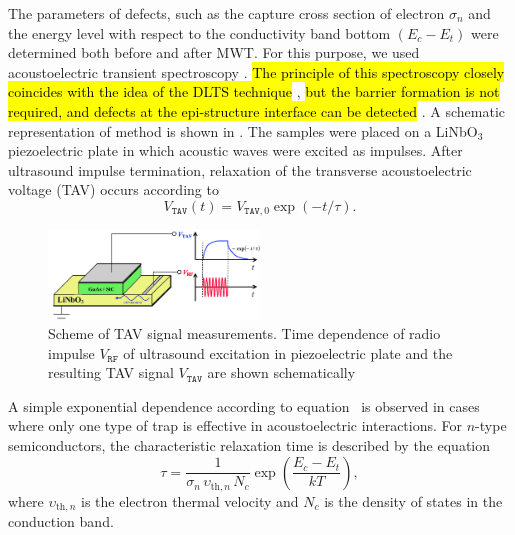 \documentclass[10pt]{iopart}
\begin{document}
The parameters of defects, such as the capture cross section of electron $\sigma_n$
and the energy level with respect to the conductivity band bottom $(E_c-E_t)$ were determined both before and after MWT.
For this purpose, we used acoustoelectric transient spectroscopy \cite{OstrovPAN,OlikhSSC,OstrovskiiSST,PANnewEn}.
\hl{The  principle of this spectroscopy closely coincides with the idea  of  the DLTS
technique} \cite{TAV:1993MIS},
\hl{but the  barrier formation is not required,
and defects at the epi-structure interface can be detected} \cite{OstrovPAN,OlikhSSC,OstrovskiiSST}.
A schematic representation of method is shown in .
The samples were placed on a LiNbO$_3$ piezoelectric plate in which acoustic waves were excited as impulses.
After ultrasound impulse termination, relaxation of the transverse  acoustoelectric voltage (TAV) occurs according to
\begin{equation}\label{eqVtav}
  V_\mathtt{TAV}(t)=V_{\mathtt{TAV},0}\exp(-t/\tau).
\end{equation}

\begin{figure}
\includegraphics[width=0.5\textwidth]{fig2}
\caption{\label{figTAV}
Scheme of TAV signal  measurements.
Time dependence of radio impulse $V_\mathtt{RF}$ of ultrasound excitation in piezoelectric plate and the resulting TAV signal $V_\mathtt{TAV}$ are shown schematically
}%
\end{figure}

A simple exponential dependence according to equation~ is observed in cases where only one type of trap is effective in acoustoelectric interactions.
For $n$-type semiconductors, the characteristic relaxation time is described by the equation \cite{OstrovPAN,OstrovskiiSST}
\begin{equation}\label{eqPANtau}
  \tau=\frac{1}{\sigma_n\,\upsilon_{\mathrm{th},n}\,N_c}\exp\left(\frac{E_c-E_t}{kT}\right),
\end{equation}
where
$\upsilon_{\mathrm{th},n}$ is the electron thermal velocity and
$N_c$ is the density of states in the conduction band.
\end{document}
